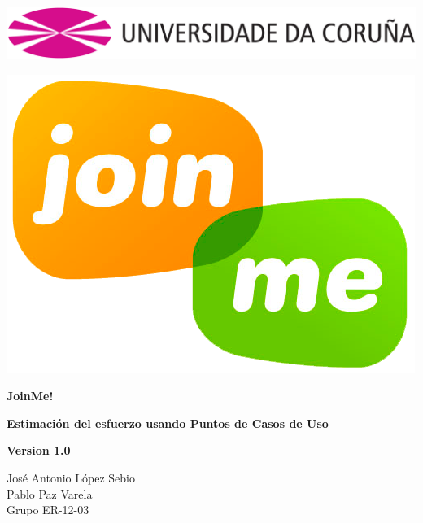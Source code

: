 \documentclass[12pt, a4paper, titlepage]{article}
\begin{document}

\begin{titlepage}

\includegraphics[width=15cm]{Imagenes/Simbolo_logo_UDC.png}

\vspace{3cm}

\begin{center}
\includegraphics[scale=0.3]{Imagenes/1a_Practica_ER_14-15.png}
\end{center}


\begin{flushright}
	
	\LARGE{\textbf{ JoinMe!}}
	
	\LARGE{\textbf{Estimación del esfuerzo usando Puntos de Casos de Uso
	}}
	
	\large{\textbf{Version 1.0}}
	
\end{flushright}

\vspace{1cm}
\begin{center}
José Antonio López Sebio\\
Pablo Paz Varela\\
Grupo ER-12-03\\
\end{center}


\end{titlepage}
\end{document}
